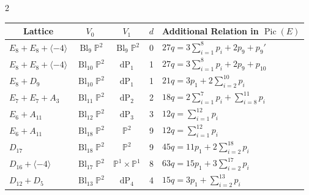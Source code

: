 \documentclass[a4paper]{amsart}
\theoremstyle{definition}
\theoremstyle{plain}
\theoremstyle{remark}
\newcommand{\PS}{\mathbb{P}}
\begin{document}
\begin{customthm}{2}
\begin{table}[h]
\centering
\begin{tabular}{|l|c|c|c|l|}
\hline
\multicolumn{1}{|c|}{\textbf{Lattice}} & $V_0$                                      & $V_1$                      & $d$ & \multicolumn{1}{c|}{\textbf{Additional Relation in $\operatorname{Pic}(E)$}} \\ \hline
$E_8+E_8+\langle -4 \rangle$           & $\operatorname{Bl}_9\PS^2$                 & $\operatorname{Bl}_9\PS^2$ & 0   & $27q=3\sum_{i=1}^{8}p_i+2p_9+p_9'$                                           \\ \hline
$E_8+E_8+\langle -4 \rangle$           & $\operatorname{Bl}_{10}\PS^2$              & $\operatorname{dP}_1$      & 1   & $27q=3\sum_{i=1}^{8}p_i+2p_9+p_{10}$                                        \\ \hline
$E_8+D_9$                              & $\operatorname{Bl}_{10}\PS^2$              & $\operatorname{dP}_1$      & 1   & $21q = 3p_1+2\sum_{i=2}^{10}p_i$                                             \\ \hline
$E_7+E_7+A_3$                          & $\operatorname{Bl}_{11}\PS^2$              & $\operatorname{dP}_2$      & 2   & $18q=2\sum_{i=1}^{7}p_i+\sum_{i=8}^{11}p_i$                                  \\ \hline
$E_6+A_{11}$                           & $\operatorname{Bl}_{12}\PS^2$              & $\operatorname{dP}_3$      & 3   & $12q=\sum_{i=1}^{12}p_i$                                                     \\ \hline
$E_6+A_{11}$                           & $\operatorname{Bl}_{18}\PS^2$              & $\PS^2$                    & 9   & $12q=\sum_{i=1}^{12}p_i$                                                     \\ \hline
$D_{17}$                               & $\operatorname{Bl}_{18}\PS^2$              & $\PS^2$                    & 9   & $45q=11p_1+2\sum_{i=2}^{18}p_i$                                              \\ \hline
$D_{16}+\langle -4\rangle$             & $\operatorname{Bl}_{17}\PS^2$              & $\PS^1\times\PS^1$         & 8   & $63q=15p_1+3\sum_{i=2}^{17}p_i$                                              \\ \hline
$D_{12}+D_5$                           & $\operatorname{Bl}_{13}\PS^2$              & $\operatorname{dP}_4$      & 4   & $15q = 3p_1+\sum_{i=2}^{13}p_i$                                              \\ \hline

\end{tabular}
\end{table}
\end{customthm}
\end{document}
